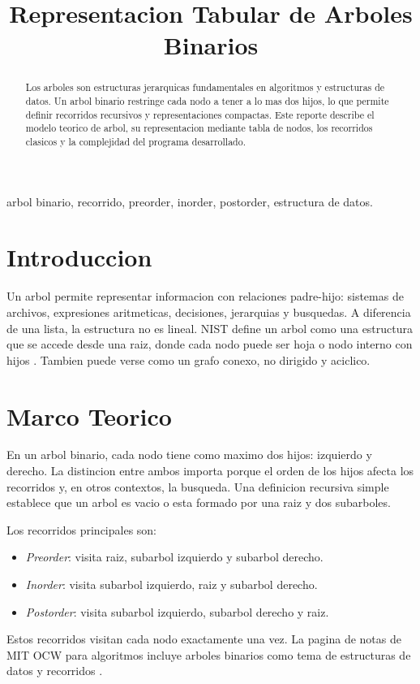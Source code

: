 \documentclass[conference]{IEEEtran}
\title{Representacion Tabular de Arboles Binarios}
\author{\IEEEauthorblockN{Ronquillo Nunez Braulio}
\IEEEauthorblockA{Analisis y Diseno de Algoritmos}}
\begin{document}
\maketitle

\begin{abstract}
Los arboles son estructuras jerarquicas fundamentales en algoritmos y
estructuras de datos. Un arbol binario restringe cada nodo a tener a lo mas
dos hijos, lo que permite definir recorridos recursivos y representaciones
compactas. Este reporte describe el modelo teorico de arbol, su
representacion mediante tabla de nodos, los recorridos clasicos y la
complejidad del programa desarrollado.
\end{abstract}

\begin{IEEEkeywords}
arbol binario, recorrido, preorder, inorder, postorder, estructura de datos.
\end{IEEEkeywords}

\section{Introduccion}
Un arbol permite representar informacion con relaciones padre-hijo: sistemas
de archivos, expresiones aritmeticas, decisiones, jerarquias y busquedas. A
diferencia de una lista, la estructura no es lineal. NIST define un arbol como
una estructura que se accede desde una raiz, donde cada nodo puede ser hoja o
nodo interno con hijos \cite{nist_tree}. Tambien puede verse como un grafo
conexo, no dirigido y aciclico.

\section{Marco Teorico}
En un arbol binario, cada nodo tiene como maximo dos hijos: izquierdo y
derecho. La distincion entre ambos importa porque el orden de los hijos afecta
los recorridos y, en otros contextos, la busqueda. Una definicion recursiva
simple establece que un arbol es vacio o esta formado por una raiz y dos
subarboles.

Los recorridos principales son:
\begin{itemize}
\item \textit{Preorder}: visita raiz, subarbol izquierdo y subarbol derecho.
\item \textit{Inorder}: visita subarbol izquierdo, raiz y subarbol derecho.
\item \textit{Postorder}: visita subarbol izquierdo, subarbol derecho y raiz.
\end{itemize}
Estos recorridos visitan cada nodo exactamente una vez. La pagina de notas de
MIT OCW para algoritmos incluye arboles binarios como tema de estructuras de
datos y recorridos \cite{mit_algorithms}.
\end{document}
